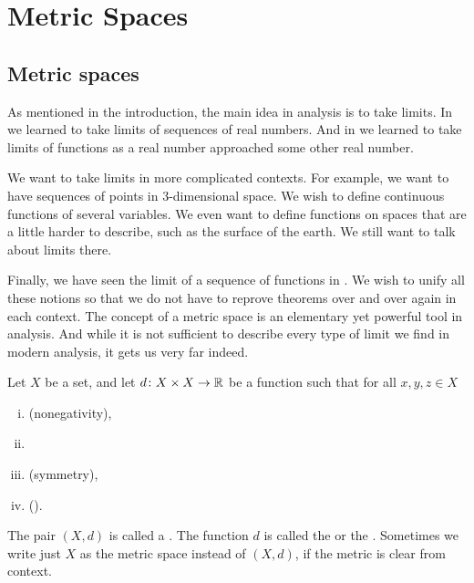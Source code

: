 \chapter{Metric Spaces} \label{ms:chapter}


\section{Metric spaces}
\label{sec:metric}


As mentioned in the introduction, the main idea in analysis is to take
limits.  In  we learned to take limits of sequences of
real numbers.  And in  we learned to take limits
of functions as a real number approached some other real number.

We want to take limits in more complicated contexts.  For
example, we want to have sequences of points in 3-dimensional space.
We wish to define continuous functions of several variables.
We even want to define functions on spaces that are a little harder to
describe, such as the surface of the earth.  We still want to talk about
limits there.

Finally, we have seen the limit of a sequence of
functions in .
We wish to unify all these notions so that we do not have to
reprove theorems over and over again in each context.  The concept of a
metric space is an elementary yet powerful tool in analysis.  And while it
is not sufficient to describe every type of limit we find in modern
analysis, it gets us very far indeed.

\begin{defn}
Let $X$ be a set, and let
$d \colon X \times X \to {\mathbb{R}}$
be a function such that for all $x,y,z \in X$
\begin{enumerate}[(i)]
%
\item \label{metric:pos}
(nonegativity),
%
\item \label{metric:zero}
%
\item \label{metric:com}
(symmetry),
%
\item \label{metric:triang}
(\emph{}).
\end{enumerate}
The pair $(X,d)$ is called a \emph{}.  The
function $d$ is called the \emph{} or the
\emph{}.
Sometimes we write just $X$ as the metric space instead of $(X,d)$, if the metric is clear from
context.
\end{defn}

